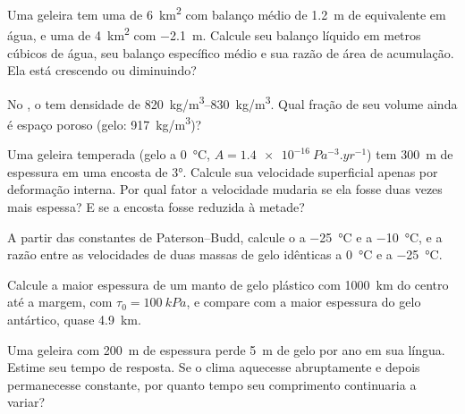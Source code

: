 \begin{exercise}[$\star$]\label{exo:b3:glaciology:3}
Uma geleira tem uma  de \qty{6}{km^2} com balanço médio de
\qty{+1.2}{m} de equivalente em água, e uma  de \qty{4}{km^2} com
\qty{-2.1}{m}. Calcule seu balanço líquido em metros cúbicos de água, seu balanço
específico médio e sua razão de área de acumulação. Ela está crescendo ou
diminuindo?
\end{exercise}

\begin{exercise}[$\star$]\label{exo:b3:glaciology:4}
No , o  tem densidade de \qtyrange{820}{830}{kg/m^3}.
Qual fração de seu volume ainda é espaço poroso (gelo:
\qty{917}{kg/m^3})?
\end{exercise}

\begin{exercise}[$\star\star$]\label{exo:b3:glaciology:5}
Uma geleira temperada (gelo a \qty{0}{\celsius}, $A =
\qty{1.4e-16}{Pa^{-3}.yr^{-1}}$) tem \qty{300}{m} de espessura em uma encosta de
\ang{3}. Calcule sua velocidade superficial apenas por deformação interna. Por qual
fator a velocidade mudaria se ela fosse duas vezes mais espessa? E se a encosta fosse
reduzida à metade?
\end{exercise}

\begin{exercise}[$\star\star$]\label{exo:b3:glaciology:6}
A partir das constantes de Paterson--Budd, calcule o  a
\qty{-25}{\celsius} e a \qty{-10}{\celsius}, e a razão entre as velocidades de
duas massas de gelo idênticas a \qty{0}{\celsius} e a \qty{-25}{\celsius}.
\end{exercise}

\begin{exercise}[$\star\star$]\label{exo:b3:glaciology:7}
Calcule a maior espessura de um manto de gelo plástico com \qty{1000}{km} do centro
até a margem, com $\tau_0 = \qty{100}{kPa}$, e compare com a
maior espessura do gelo antártico, quase \qty{4.9}{km}.
\end{exercise}

\begin{exercise}[$\star\star$]\label{exo:b3:glaciology:8}
Uma geleira com \qty{200}{m} de espessura perde \qty{5}{m} de gelo por ano em sua língua.
Estime seu tempo de resposta. Se o clima aquecesse abruptamente e depois
permanecesse constante, por quanto tempo seu comprimento continuaria a variar?
\end{exercise}

